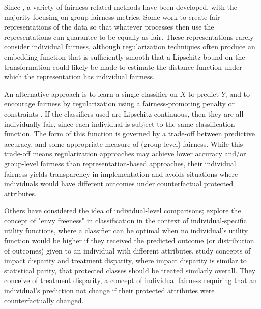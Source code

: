         Since \citet{dwork2012fairness}, a variety of fairness-related methods have been developed, with the majority focusing on group fairness metrics. Some work to create fair representations \cite{dwork2012fairness,ZemQiSwePitDwo2013,MadCrePitZem2018} of the data so that whatever processes then use the representations can guarantee to be equally as fair.  These representations rarely consider individual fairness, although regularization techniques often produce an embedding function that is sufficiently smooth that a Lipschitz bound on the transformation could likely be made to estimate the distance function under which the representation has individual fairness.
        
        An alternative approach is to learn a single classifier on $X$ to predict $Y$, and to encourage fairness by regularization using a fairness-promoting penalty \citep{KamAkaSak2011,KamAkHidSak2012,berk2017convex} or constraints \citep{zafar2017parity,zafar2017aistats,AgaBeyDudLanWal2018}. If the classifiers used are Lipschitz-continuous, then they are all individually fair, since each individual is subject to the same classification function. The form of this function is governed by a trade-off between predictive accuracy, and some appropriate measure of (group-level) fairness. While this trade-off means regularization approaches may achieve lower accuracy and/or group-level fairness than representation-based approaches, their individual fairness yields transparency in implementation and avoids situations where individuals would have different outcomes under counterfactual protected attributes.

        Others have considered the idea of individual-level comparisons; \citet{balcan2018} explore the concept of "envy freeness" in classification in the context of individual-specific utility functions, where a classifier can be optimal when no individual's utility function would be higher if they received the predicted outcome (or distribution of outcomes) given to an individual with different attributes. \citet{lipton2018treatmentdisparity} study concepts of impact disparity and treatment disparity, where impact disparity is similar to statistical parity, that protected classes should be treated similarly overall.  They conceive of treatment disparity, a concept of individual fairness requiring that an individual's prediction not change if their protected attributes were counterfactually changed.